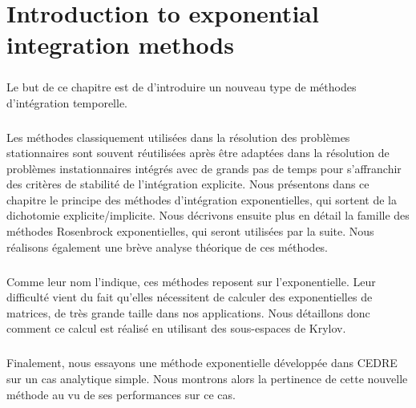\chapter{Introduction to exponential integration methods}

\begin{tcolorbox}[title=Résumé du chapitre : Introduction aux méthodes d'intégration exponentielles, colframe=black!50!white]
  \paragraph{}
  Le but de ce chapitre est de d'introduire un nouveau type de méthodes d'intégration temporelle.

  \paragraph{}
  Les méthodes classiquement utilisées dans la résolution des problèmes stationnaires sont souvent réutilisées après être adaptées dans la résolution de problèmes instationnaires intégrés avec de grands pas de temps pour s'affranchir des critères de stabilité de l'intégration explicite.
  Nous présentons dans ce chapitre le principe des méthodes d'intégration exponentielles, qui sortent de la dichotomie explicite/implicite.
  Nous décrivons ensuite plus en détail la famille des méthodes Rosenbrock exponentielles, qui seront utilisées par la suite.
  Nous réalisons également une brève analyse théorique de ces méthodes.

  \paragraph{}
  Comme leur nom l'indique, ces méthodes reposent sur l'exponentielle.
  Leur difficulté vient du fait qu'elles nécessitent de calculer des exponentielles de matrices, de très grande taille dans nos applications.
  Nous détaillons donc comment ce calcul est réalisé en utilisant des sous-espaces de Krylov.

  \paragraph{}
  Finalement, nous essayons une méthode exponentielle développée dans CEDRE sur un cas analytique simple.
  Nous montrons alors la pertinence de cette nouvelle méthode au vu de ses performances sur ce cas.
\end{tcolorbox}


  \vspace{1cm}
